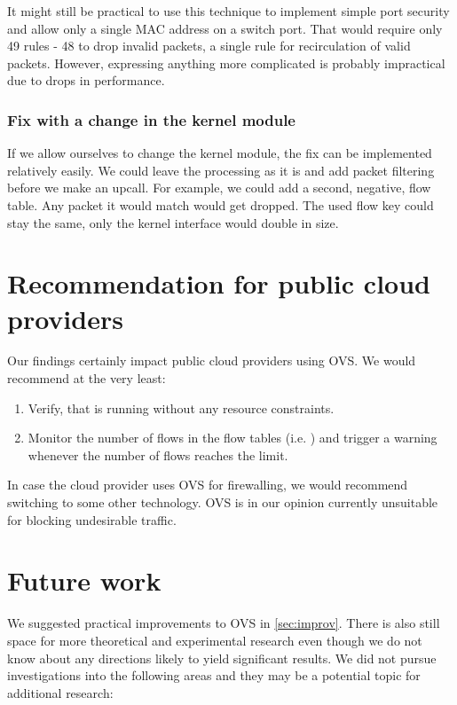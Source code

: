 It might still be practical to use this technique to implement simple port security and allow only a single MAC address on a switch port. That would require only 49 rules - 48 to drop invalid packets, a single rule for recirculation of valid packets. However, expressing anything more complicated is probably impractical due to drops in performance.

\subsubsection{Fix with a change in the kernel module}

If we allow ourselves to change the kernel module, the fix can be implemented relatively easily. We could leave the processing as it is and add packet filtering before we make an upcall. For example, we could add a second, negative, flow table. Any packet it would match would get dropped. The used flow key could stay the same, only the kernel interface would double in size.


\section{Recommendation for public cloud providers}

Our findings certainly impact public cloud providers using OVS. We would recommend at the very least:

\begin{enumerate}
    \item Verify, that  is running without any resource constraints.
    \item Monitor the number of flows in the flow tables (i.e. ) and trigger a warning whenever the number of flows reaches the limit.
\end{enumerate}

In case the cloud provider uses OVS for firewalling, we would recommend switching to some other technology. OVS is in our opinion currently unsuitable for blocking undesirable traffic.


\section{Future work}

We suggested practical improvements to OVS in \cref{sec:improv}. There is also still space for more theoretical and experimental research even though we do not know about any directions likely to yield significant results. We did not pursue investigations into the following areas and they may be a potential topic for additional research:

